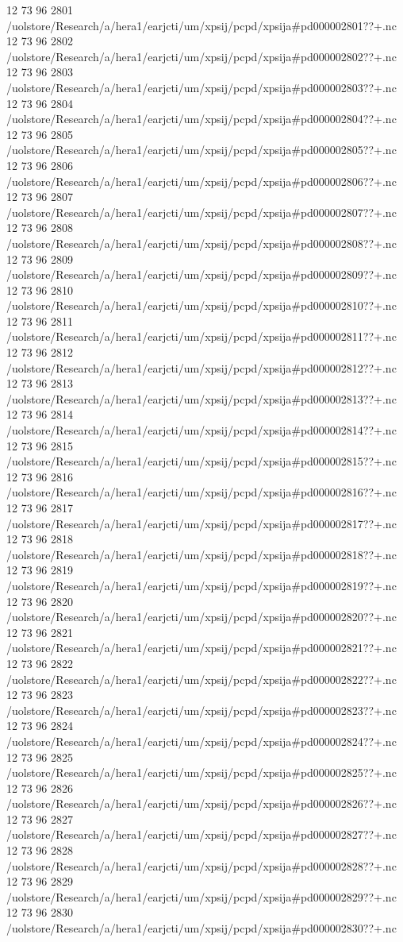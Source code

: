 12 73 96
2801
/uolstore/Research/a/hera1/earjcti/um/xpsij/pcpd/xpsija#pd000002801??+.nc
12 73 96
2802
/uolstore/Research/a/hera1/earjcti/um/xpsij/pcpd/xpsija#pd000002802??+.nc
12 73 96
2803
/uolstore/Research/a/hera1/earjcti/um/xpsij/pcpd/xpsija#pd000002803??+.nc
12 73 96
2804
/uolstore/Research/a/hera1/earjcti/um/xpsij/pcpd/xpsija#pd000002804??+.nc
12 73 96
2805
/uolstore/Research/a/hera1/earjcti/um/xpsij/pcpd/xpsija#pd000002805??+.nc
12 73 96
2806
/uolstore/Research/a/hera1/earjcti/um/xpsij/pcpd/xpsija#pd000002806??+.nc
12 73 96
2807
/uolstore/Research/a/hera1/earjcti/um/xpsij/pcpd/xpsija#pd000002807??+.nc
12 73 96
2808
/uolstore/Research/a/hera1/earjcti/um/xpsij/pcpd/xpsija#pd000002808??+.nc
12 73 96
2809
/uolstore/Research/a/hera1/earjcti/um/xpsij/pcpd/xpsija#pd000002809??+.nc
12 73 96
2810
/uolstore/Research/a/hera1/earjcti/um/xpsij/pcpd/xpsija#pd000002810??+.nc
12 73 96
2811
/uolstore/Research/a/hera1/earjcti/um/xpsij/pcpd/xpsija#pd000002811??+.nc
12 73 96
2812
/uolstore/Research/a/hera1/earjcti/um/xpsij/pcpd/xpsija#pd000002812??+.nc
12 73 96
2813
/uolstore/Research/a/hera1/earjcti/um/xpsij/pcpd/xpsija#pd000002813??+.nc
12 73 96
2814
/uolstore/Research/a/hera1/earjcti/um/xpsij/pcpd/xpsija#pd000002814??+.nc
12 73 96
2815
/uolstore/Research/a/hera1/earjcti/um/xpsij/pcpd/xpsija#pd000002815??+.nc
12 73 96
2816
/uolstore/Research/a/hera1/earjcti/um/xpsij/pcpd/xpsija#pd000002816??+.nc
12 73 96
2817
/uolstore/Research/a/hera1/earjcti/um/xpsij/pcpd/xpsija#pd000002817??+.nc
12 73 96
2818
/uolstore/Research/a/hera1/earjcti/um/xpsij/pcpd/xpsija#pd000002818??+.nc
12 73 96
2819
/uolstore/Research/a/hera1/earjcti/um/xpsij/pcpd/xpsija#pd000002819??+.nc
12 73 96
2820
/uolstore/Research/a/hera1/earjcti/um/xpsij/pcpd/xpsija#pd000002820??+.nc
12 73 96
2821
/uolstore/Research/a/hera1/earjcti/um/xpsij/pcpd/xpsija#pd000002821??+.nc
12 73 96
2822
/uolstore/Research/a/hera1/earjcti/um/xpsij/pcpd/xpsija#pd000002822??+.nc
12 73 96
2823
/uolstore/Research/a/hera1/earjcti/um/xpsij/pcpd/xpsija#pd000002823??+.nc
12 73 96
2824
/uolstore/Research/a/hera1/earjcti/um/xpsij/pcpd/xpsija#pd000002824??+.nc
12 73 96
2825
/uolstore/Research/a/hera1/earjcti/um/xpsij/pcpd/xpsija#pd000002825??+.nc
12 73 96
2826
/uolstore/Research/a/hera1/earjcti/um/xpsij/pcpd/xpsija#pd000002826??+.nc
12 73 96
2827
/uolstore/Research/a/hera1/earjcti/um/xpsij/pcpd/xpsija#pd000002827??+.nc
12 73 96
2828
/uolstore/Research/a/hera1/earjcti/um/xpsij/pcpd/xpsija#pd000002828??+.nc
12 73 96
2829
/uolstore/Research/a/hera1/earjcti/um/xpsij/pcpd/xpsija#pd000002829??+.nc
12 73 96
2830
/uolstore/Research/a/hera1/earjcti/um/xpsij/pcpd/xpsija#pd000002830??+.nc
